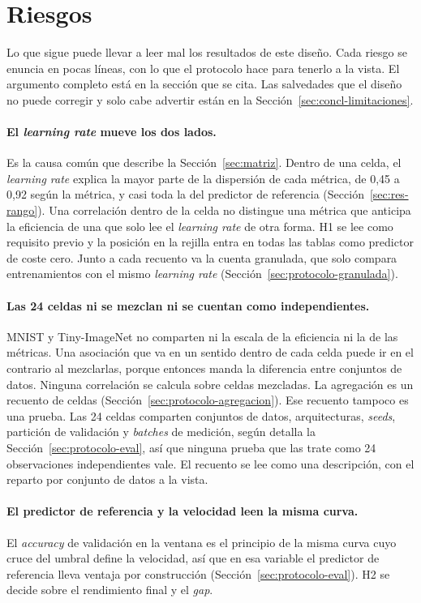 \section{Riesgos}
\label{sec:riesgos}

Lo que sigue puede llevar a leer mal los resultados de este diseño. Cada riesgo se enuncia en pocas líneas, con lo que el protocolo hace para tenerlo a la vista. El argumento completo está en la sección que se cita. Las salvedades que el diseño no puede corregir y solo cabe advertir están en la Sección~\ref{sec:concl-limitaciones}.

\paragraph{El \emph{learning rate} mueve los dos lados.} Es la causa común que describe la Sección~\ref{sec:matriz}. Dentro de una celda, el \emph{learning rate} explica la mayor parte de la dispersión de cada métrica, de 0,45 a 0,92 según la métrica, y casi toda la del predictor de referencia (Sección~\ref{sec:res-rango}). Una correlación dentro de la celda no distingue una métrica que anticipa la eficiencia de una que solo lee el \emph{learning rate} de otra forma. H1 se lee como requisito previo y la posición en la rejilla entra en todas las tablas como predictor de coste cero. Junto a cada recuento va la cuenta granulada, que solo compara entrenamientos con el mismo \emph{learning rate} (Sección~\ref{sec:protocolo-granulada}).

\paragraph{Las 24 celdas ni se mezclan ni se cuentan como independientes.} MNIST y Tiny-ImageNet no comparten ni la escala de la eficiencia ni la de las métricas. Una asociación que va en un sentido dentro de cada celda puede ir en el contrario al mezclarlas, porque entonces manda la diferencia entre conjuntos de datos. Ninguna correlación se calcula sobre celdas mezcladas. La agregación es un recuento de celdas (Sección~\ref{sec:protocolo-agregacion}). Ese recuento tampoco es una prueba. Las 24 celdas comparten conjuntos de datos, arquitecturas, \emph{seeds}, partición de validación y \emph{batches} de medición, según detalla la Sección~\ref{sec:protocolo-eval}, así que ninguna prueba que las trate como 24 observaciones independientes vale. El recuento se lee como una descripción, con el reparto por conjunto de datos a la vista.

\paragraph{El predictor de referencia y la velocidad leen la misma curva.} El \emph{accuracy} de validación en la ventana es el principio de la misma curva cuyo cruce del umbral define la velocidad, así que en esa variable el predictor de referencia lleva ventaja por construcción (Sección~\ref{sec:protocolo-eval}). H2 se decide sobre el rendimiento final y el \emph{gap}.

